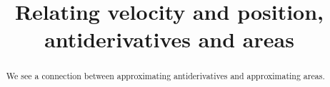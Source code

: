 \documentclass{ximera}
\title[Dig-In:]{Relating velocity and position, antiderivatives and areas}
\begin{document}
\begin{abstract}
We see a connection between approximating antiderivatives and approximating areas. 
\end{abstract}
\maketitle

  
\end{document}
